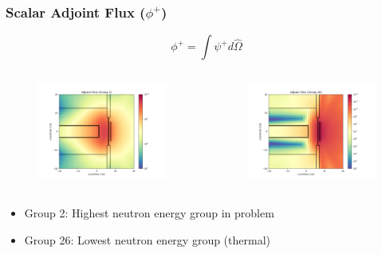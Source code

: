 \documentclass[t]{beamer}
\begin{document}
\begin{frame}
  \frametitle{Scalar Adjoint Flux ($\phi^+$)}
  \vskip-0.25in
  \begin{equation}
    \phi^+ = \int\psi^+d\hat{\Omega}
  \end{equation}
  \vskip-0.25in
  \begin{columns}
    \begin{figure}
      \includegraphics[trim={0.7in 0.15in 1.05in 0.4in},clip,scale=0.36]{images/scalar_flux_adj_g02.png}
    \end{figure}
    \begin{figure}
      \includegraphics[trim={0.7in 0.15in 1.05in 0.4in},clip,scale=0.36]{images/scalar_flux_adj_g26.png}
    \end{figure}
  \end{columns}
  \begin{itemize}
    \item Group 2: Highest neutron energy group in problem
    \item Group 26: Lowest neutron energy group (thermal)
  \end{itemize}
\end{frame}
\end{document}
